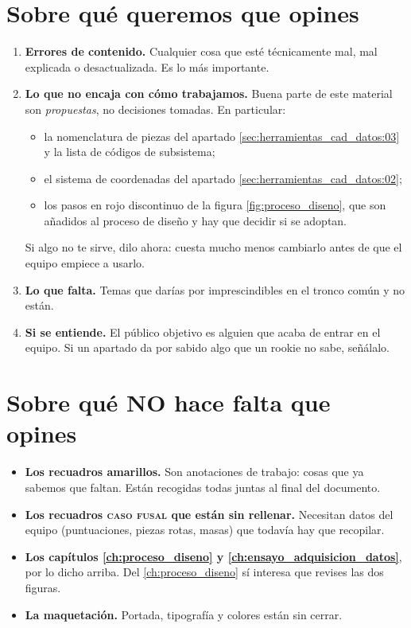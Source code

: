 \section*{Sobre qué queremos que opines}

\begin{enumerate}
  \item \textbf{Errores de contenido.} Cualquier cosa que esté técnicamente mal,
        mal explicada o desactualizada. Es lo más importante.
  \item \textbf{Lo que no encaja con cómo trabajamos.} Buena parte de este
        material son \emph{propuestas}, no decisiones tomadas. En particular:
        \begin{itemize}
          \item la nomenclatura de piezas del apartado
                \ref{sec:herramientas_cad_datos:03} y la lista de códigos de
                subsistema;
          \item el sistema de coordenadas del apartado
                \ref{sec:herramientas_cad_datos:02};
          \item los pasos en \textcolor{fusalSec}{rojo discontinuo} de la figura
                \ref{fig:proceso_diseno}, que son añadidos al proceso de diseño y
                hay que decidir si se adoptan.
        \end{itemize}
        Si algo no te sirve, dilo ahora: cuesta mucho menos cambiarlo antes de
        que el equipo empiece a usarlo.
  \item \textbf{Lo que falta.} Temas que darías por imprescindibles en el tronco
        común y no están.
  \item \textbf{Si se entiende.} El público objetivo es alguien que acaba de
        entrar en el equipo. Si un apartado da por sabido algo que un rookie no
        sabe, señálalo.
\end{enumerate}

\section*{Sobre qué NO hace falta que opines}

\begin{itemize}
  \item \textbf{Los recuadros amarillos.} Son anotaciones de trabajo: cosas que ya
        sabemos que faltan. Están recogidas todas juntas al final del documento.
  \item \textbf{Los recuadros \textsc{caso fusal} que están sin rellenar.}
        Necesitan datos del equipo (puntuaciones, piezas rotas, masas) que
        todavía hay que recopilar.
  \item \textbf{Los capítulos \ref{ch:proceso_diseno} y
        \ref{ch:ensayo_adquisicion_datos}}, por lo dicho arriba. Del
        \ref{ch:proceso_diseno} sí interesa que revises las dos figuras.
  \item \textbf{La maquetación.} Portada, tipografía y colores están sin cerrar.
\end{itemize}

